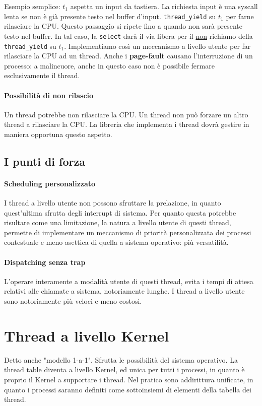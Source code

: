 \documentclass{report}
\begin{document}
Esempio semplice: $t_1$ aspetta un input da tastiera. La richiesta input è una syscall lenta se non è già presente testo nel buffer d'input. \verb|thread_yield| su $t_1$ per farne rilasciare la CPU. Questo passaggio si ripete fino a quando non sarà presente testo nel buffer. In tal caso, la \verb|select| darà il via libera per il \underline{non} richiamo della \verb|thread_yield| su $t_1$. Implementiamo così un meccanismo a livello utente per far rilasciare la CPU ad un thread.
Anche i \textbf{page-fault} causano l'interruzione di un processo: a malincuore, anche in questo caso non è possibile fermare esclusivamente il thread.

\paragraph{Possibilità di non rilascio}
Un thread potrebbe non rilasciare la CPU. Un thread non può forzare un altro thread a rilasciare la CPU. La libreria che implementa i thread dovrà gestire in maniera opportuna questo aspetto.

\subsection{I punti di forza}
\paragraph{Scheduling personalizzato}
I thread a livello utente non possono sfruttare la prelazione, in quanto quest'ultima sfrutta degli interrupt di sistema. Per quanto questa potrebbe risultare come una limitazione, la natura a livello utente di questi thread, permette di implementare un meccanismo di priorità personalizzata dei processi contestuale e meno asettica di quella a sistema operativo: più versatilità.

\paragraph{Dispatching senza trap}
L'operare interamente a modalità utente di questi thread, evita i tempi di attesa relativi alle chiamate a sistema, notoriamente lunghe. I thread a livello utente sono notoriamente più veloci e meno costosi.

\newpage

\section{Thread a livello Kernel}
Detto anche "modello 1-a-1". Sfrutta le possibilità del sistema operativo. La thread table diventa a livello Kernel, ed unica per tutti i processi, in quanto è proprio il Kernel a supportare i thread. Nel pratico sono addirittura unificate, in quanto i processi saranno definiti come sottoinsiemi di elementi della tabella dei thread.
\end{document}
